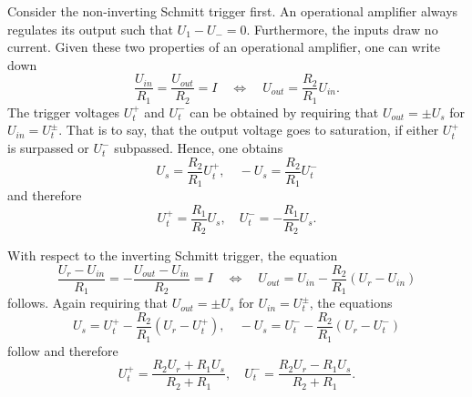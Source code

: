 \documentclass{report}
\numberwithin{tm}{section}
\begin{document}
Consider the non-inverting Schmitt trigger first. An operational amplifier always regulates its output such that $U_1 - U_- = 0$. Furthermore, the inputs draw no current. Given these two properties of an operational amplifier, one can write down \begin{equation}
	\frac{U_{in}}{R_1} = \frac{U_{out}}{R_2} = I \quad \Leftrightarrow \quad U_{out} = \frac{R_2}{R_1}U_{in}.
\end{equation} The trigger voltages $U_t^+$ and $U_t^-$ can be obtained by requiring that $U_{out} = \pm U_s$ for $U_{in} = U_t^\pm$. That is to say, that the output voltage goes to saturation, if either $U_t^+$ is surpassed or $U_t^-$ subpassed. Hence, one obtains \begin{equation}
U_s = \frac{R_2}{R_1}U_t^+, \quad -U_s = \frac{R_2}{R_1}U_t^-
\end{equation} and therefore \begin{equation}
U_t^+ = \frac{R_1}{R_2}U_s, \quad U_t^- = -\frac{R_1}{R_2}U_s.
\end{equation}

With respect to the inverting Schmitt trigger, the equation \begin{equation}
	\frac{U_r-U_{in}}{R_1} = -\frac{U_{out}-U_{in}}{R_2}=I \quad \Leftrightarrow \quad U_{out} = U_{in} - \frac{R_2}{R_1}(U_r-U_{in})
\end{equation} follows. Again requiring that $U_{out} = \pm U_s$ for $U_{in} = U_t^\pm$, the equations \begin{equation}
U_s = U_t^+-\frac{R_2}{R_1}(U_r - U_t^+), \quad -U_s = U_t^--\frac{R_2}{R_1}(U_r - U_t^-)
\end{equation} follow and therefore
\begin{equation}
	U_t^+ = \frac{R_2U_r + R_1U_s}{R_2 + R_1}, \quad U_t^- = \frac{R_2U_r - R_1U_s}{R_2 + R_1}.
\end{equation}
\end{document}
